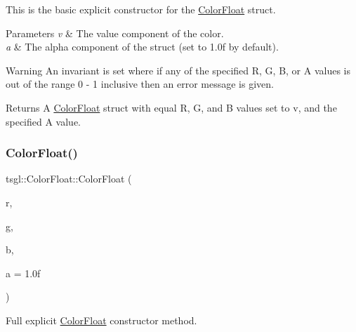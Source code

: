 This is the basic explicit constructor for the \hyperlink{structtsgl_1_1_color_float}{Color\+Float} struct. 
\begin{DoxyParams}{Parameters}
{\em v} & The value component of the color. \\
\hline
{\em a} & The alpha component of the struct (set to 1.\+0f by default). \\
\hline
\end{DoxyParams}
\begin{DoxyWarning}{Warning}
An invariant is set where if any of the specified R, G, B, or A values is out of the range 0 -\/ 1 inclusive then an error message is given. 
\end{DoxyWarning}
\begin{DoxyReturn}{Returns}
A \hyperlink{structtsgl_1_1_color_float}{Color\+Float} struct with equal R, G, and B values set to {\ttfamily v}, and the specified A value. 
\end{DoxyReturn}
\mbox{\label{structtsgl_1_1_color_float_af52e422d50038bc2b516abb3826f2e17}} 
\subsubsection{\texorpdfstring{Color\+Float()}{ColorFloat()}\hspace{0.1cm}{\footnotesize\ttfamily [3/3]}}
{\footnotesize\ttfamily tsgl\+::\+Color\+Float\+::\+Color\+Float (\begin{DoxyParamCaption}\item[{G\+Lfloat}]{r,  }\item[{G\+Lfloat}]{g,  }\item[{G\+Lfloat}]{b,  }\item[{G\+Lfloat}]{a = {\ttfamily 1.0f} }\end{DoxyParamCaption})}



Full explicit \hyperlink{structtsgl_1_1_color_float}{Color\+Float} constructor method. 

